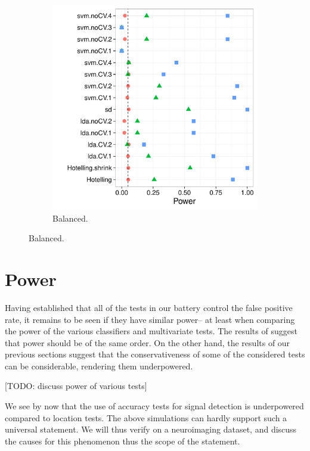 \documentclass[12pt,a4paper]{article}
\begin{document}
\begin{figure}[h]
\begin{subfigure}{.5\textwidth}
	  \includegraphics[width=1\linewidth]{"art/2016-07-27 11:42:05"}
	  \caption{Balanced.} %
	\label{fig:simulation_12}
	\end{subfigure}
	
\end{figure}




\section{Power}
\label{sec:power}

Having established that all of the tests in our battery control the false positive rate, it remains to be seen if they have similar power-- at least when comparing the power of the various classifiers and multivariate tests. 
The results of \cite{ramdas_classification_2016} suggest that power should be of the same order. 
On the other hand, the results of our previous sections suggest that the conservativeness of some of the considered tests can be considerable, rendering them underpowered. 

[TODO: discuss power of various tests]

We see by now that the use of accuracy tests for signal detection is underpowered compared to location tests. 
The above simulations can hardly support such a universal statement. 
We will thus verify on a neuroimaging dataset, and discuss the causes for this phenomenon thus the scope of the statement.
\end{document}
